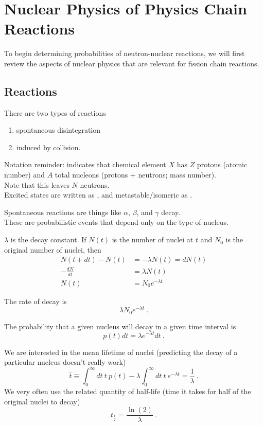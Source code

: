 \documentclass[12pt]{article}
\begin{document}
\clearpage
\section*{Nuclear Physics of Physics Chain Reactions}
To begin determining probabilities of neutron-nuclear reactions, we will first review the aspects of nuclear physics that are relevant for fission chain reactions. 

\subsection*{Reactions}
There are two types of reactions
\begin{enumerate}
\item spontaneous disintegration
\item induced by collision.
\end{enumerate}

Notation reminder:  indicates that chemical element $X$ has $Z$ protons (atomic number) and $A$ total nucleons (protons + neutrons; mass number).\\
Note that this leaves $N$ neutrons.\\
Excited states are written as , and metastable/isomeric as .

Spontaneous reactions are things like $\alpha$, $\beta$, and $\gamma$ decay.\\
These are probabilistic events that depend only on the type of nucleus.

$\lambda$ is the decay constant. If $N(t)$ is the number of nuclei at $t$ and $N_0$ is the original number of nuclei, then
%
\begin{align*}
N(t + dt) - N(t) &= -\lambda N(t) = dN(t)\\
-\frac{dN}{dt} &= \lambda N(t)\\
N(t) &= N_0 e^{-\lambda t}
\end{align*}

The rate of decay is\[\lambda N_0 e^{-\lambda t} \:.\]

The probability that a given nucleus will decay in a given time interval is \[p(t) dt = \lambda e^{-\lambda t} dt \:.\]

We are interested in the mean lifetime of nuclei (predicting the decay of a particular nucleus doesn't really work)
\[\bar{t} \equiv \int_0^\infty dt \: t \: p(t) - \lambda \int_0^\infty dt \: t \: e^{-\lambda t} = \frac{1}{\lambda} \:. \]
We very often use the related quantity of half-life (time it takes for half of the original nuclei to decay) 
\[t_{\frac{1}{2}} = \frac{\ln(2)}{\lambda} \:. \]
\end{document}
